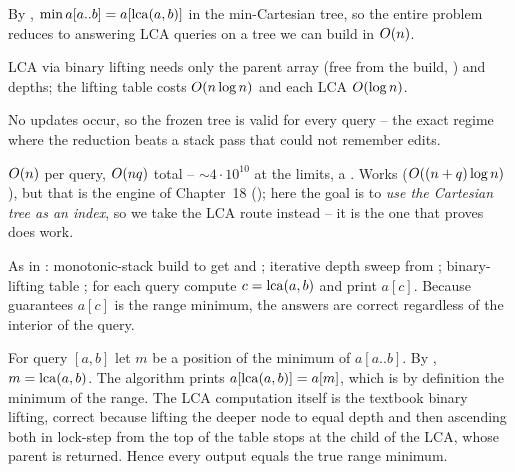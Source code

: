 \begin{observation}
By , $\min a[a..b] = a[\operatorname{lca}(a,b)]$ in the min-Cartesian tree, so the entire problem
reduces to answering LCA queries on a tree we can build in $O(n)$.
\end{observation}
\begin{observation}
LCA via binary lifting needs only the parent array (free from the build, ) and
depths; the lifting table costs $O(n\log n)$ and each LCA $O(\log n)$.
\end{observation}
\begin{observation}
No updates occur, so the frozen tree is valid for every query -- the exact regime where the reduction
beats a stack pass that could not remember edits.
\end{observation}

\begin{thinkbox}
{$O(n)$ per query, $O(nq)$ total -- $\sim4\cdot10^{10}$ at the limits, a \tle.}
{Works ($O((n+q)\log n)$), but that is the engine of Chapter~18 (); here the goal is to
\emph{use the Cartesian tree as an index}, so we take the LCA route instead -- it is the one that proves
 does work.}
\end{thinkbox}

As in : monotonic-stack build to get  and ; iterative depth
sweep from ; binary-lifting table ; for each query compute $c=\operatorname{lca}(a,b)$ and print
$a[c]$. Because  guarantees $a[c]$ is the range minimum, the answers are correct
regardless of the interior of the query.

\begin{proofbox}
For query $[a,b]$ let $m$ be a position of the minimum of $a[a..b]$. By , $m=\operatorname{lca}(a,b)$.
The algorithm prints $a[\operatorname{lca}(a,b)]=a[m]$, which is by definition the minimum of the range. The LCA
computation itself is the textbook binary lifting, correct because lifting the deeper node to equal depth
and then ascending both in lock-step from the top of the table stops at the child of the LCA, whose
parent is returned. Hence every output equals the true range minimum. \end{proofbox}

